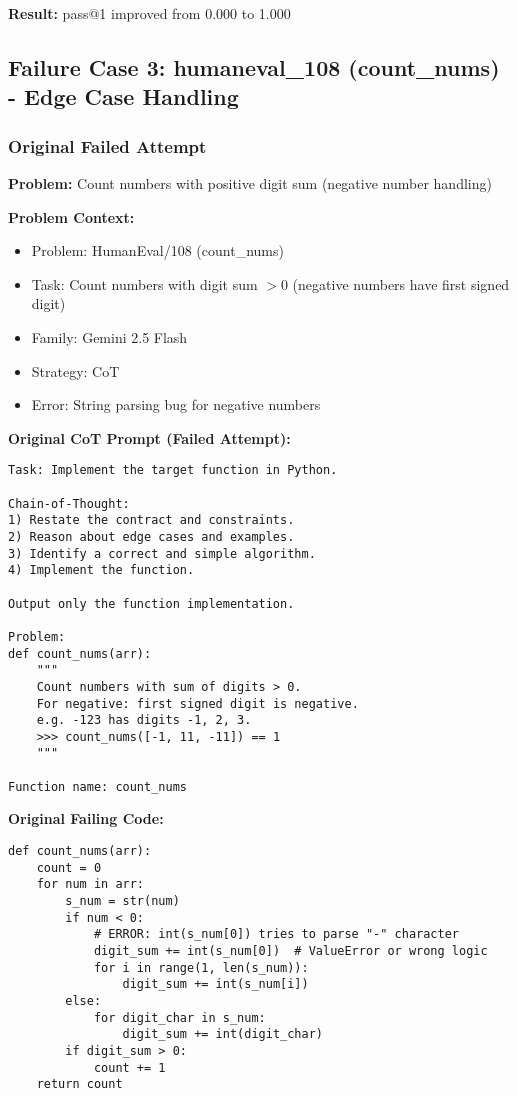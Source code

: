 \documentclass[11pt]{article}
\begin{document}
\textbf{Result:} pass@1 improved from 0.000 to 1.000

\subsection{Failure Case 3: humaneval\_108 (count\_nums) - Edge Case Handling}

\subsubsection{Original Failed Attempt}

\textbf{Problem:} Count numbers with positive digit sum (negative number handling)

\textbf{Problem Context:}
\begin{itemize}
    \item Problem: HumanEval/108 (count\_nums)
    \item Task: Count numbers with digit sum $> 0$ (negative numbers have first signed digit)
    \item Family: Gemini 2.5 Flash
    \item Strategy: CoT
    \item Error: String parsing bug for negative numbers
\end{itemize}

\textbf{Original CoT Prompt (Failed Attempt):}
\begin{lstlisting}
Task: Implement the target function in Python.

Chain-of-Thought:
1) Restate the contract and constraints.
2) Reason about edge cases and examples.
3) Identify a correct and simple algorithm.
4) Implement the function.

Output only the function implementation.

Problem:
def count_nums(arr):
    """
    Count numbers with sum of digits > 0.
    For negative: first signed digit is negative.
    e.g. -123 has digits -1, 2, 3.
    >>> count_nums([-1, 11, -11]) == 1
    """

Function name: count_nums
\end{lstlisting}

\textbf{Original Failing Code:}
\begin{lstlisting}
def count_nums(arr):
    count = 0
    for num in arr:
        s_num = str(num)
        if num < 0:
            # ERROR: int(s_num[0]) tries to parse "-" character
            digit_sum += int(s_num[0])  # ValueError or wrong logic
            for i in range(1, len(s_num)):
                digit_sum += int(s_num[i])
        else:
            for digit_char in s_num:
                digit_sum += int(digit_char)
        if digit_sum > 0:
            count += 1
    return count
\end{lstlisting}
\end{document}
